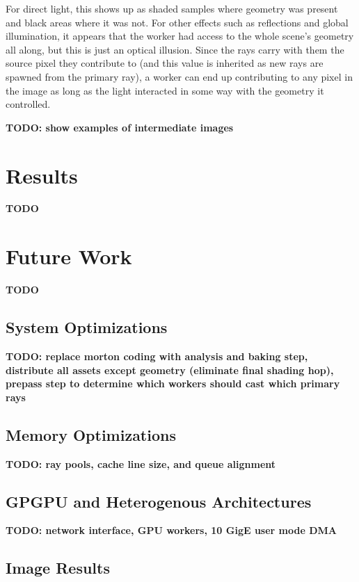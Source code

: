 \documentclass[12pt]{ucthesis}
\begin{document}
For direct light, this shows up as shaded samples where geometry was present
and black areas where it was not. For other effects such as reflections and
global illumination, it appears that the worker had access to the whole scene's
geometry all along, but this is just an optical illusion. Since the rays
carry with them the source pixel they contribute to (and this value is inherited
as new rays are spawned from the primary ray), a worker can end up contributing
to any pixel in the image as long as the light interacted in some way with the
geometry it controlled.

\textbf{TODO: show examples of intermediate images}

\chapter{Results}
\label{results}

\textbf{TODO}

\chapter{Future Work}
\label{futurework}

\textbf{TODO}

\section{System Optimizations}
\label{optimizations}

\textbf{TODO: replace morton coding with analysis and baking step, distribute all assets except geometry (eliminate final shading hop), prepass step to determine which workers should cast which primary rays}

\section{Memory Optimizations}
\label{memory}

\textbf{TODO: ray pools, cache line size, and queue alignment}

\section{GPGPU and Heterogenous Architectures}
\label{hetergenous}

\textbf{TODO: network interface, GPU workers, 10 GigE user mode DMA}

\clearpage



\section*{Image Results}
\end{document}
